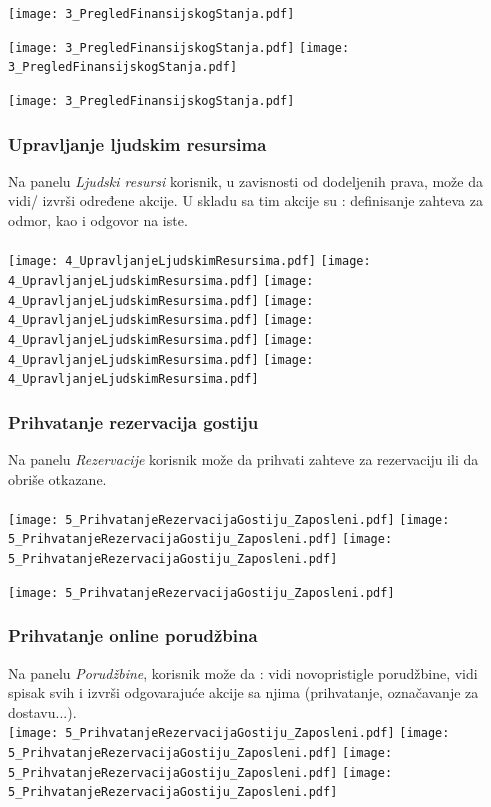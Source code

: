 \documentclass{article}
\begin{document}
\texttt{[image: 3\_PregledFinansijskogStanja.pdf]}

\texttt{[image: 3\_PregledFinansijskogStanja.pdf]}
\texttt{[image: 3\_PregledFinansijskogStanja.pdf]}

\texttt{[image: 3\_PregledFinansijskogStanja.pdf]}
 \newpage
\subsubsection{Upravljanje ljudskim resursima}
Na panelu \emph{Ljudski resursi} korisnik, u zavisnosti od dodeljenih prava, može da vidi/ izvrši određene akcije. U skladu sa tim akcije su : definisanje zahteva za odmor, kao i odgovor na iste.\\\\
\texttt{[image: 4\_UpravljanjeLjudskimResursima.pdf]}
 \vfill
\texttt{[image: 4\_UpravljanjeLjudskimResursima.pdf]}
\noindent
\texttt{[image: 4\_UpravljanjeLjudskimResursima.pdf]}
\texttt{[image: 4\_UpravljanjeLjudskimResursima.pdf]}
\texttt{[image: 4\_UpravljanjeLjudskimResursima.pdf]}
\texttt{[image: 4\_UpravljanjeLjudskimResursima.pdf]}
\texttt{[image: 4\_UpravljanjeLjudskimResursima.pdf]}
\subsubsection{Prihvatanje rezervacija gostiju}
Na panelu \emph{Rezervacije} korisnik može da prihvati zahteve za rezervaciju ili da obriše otkazane.\\\\
 \texttt{[image: 5\_PrihvatanjeRezervacijaGostiju\_Zaposleni.pdf]}
\texttt{[image: 5\_PrihvatanjeRezervacijaGostiju\_Zaposleni.pdf]}
\vfill
\texttt{[image: 5\_PrihvatanjeRezervacijaGostiju\_Zaposleni.pdf]}
    
\texttt{[image: 5\_PrihvatanjeRezervacijaGostiju\_Zaposleni.pdf]}
   

\subsubsection{Prihvatanje online porudžbina}
Na panelu \emph{Porudžbine}, korisnik može da : vidi novopristigle porudžbine, vidi spisak svih i izvrši odgovarajuće akcije sa njima (prihvatanje, označavanje za dostavu...).\\
\texttt{[image: 5\_PrihvatanjeRezervacijaGostiju\_Zaposleni.pdf]}
\vfill
\texttt{[image: 5\_PrihvatanjeRezervacijaGostiju\_Zaposleni.pdf]}
\vfill
\texttt{[image: 5\_PrihvatanjeRezervacijaGostiju\_Zaposleni.pdf]}
\texttt{[image: 5\_PrihvatanjeRezervacijaGostiju\_Zaposleni.pdf]}
\end{document}
